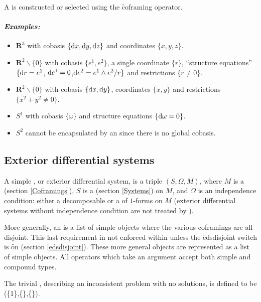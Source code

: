 A  is constructed or selected using the \f{coframing}
operator.

\paragraph{\textit{Examples:}}
\begin{itemize}
\item ${\mathbf{R}}^3$ with cobasis $\{\mathrm{d} x,\mathrm{d} y,\mathrm{d} z\}$ and coordinates $\{x,y,z\}$.
\item ${\mathbf{R}}^2\backslash\{0\}$ with cobasis $\{e^1,e^2\}$, a single
	coordinate $\{r\}$, ``structure equations'' $\{\mathrm{d} r = e^1$,
	$\mathrm{d} e^1=0$,$\mathrm{d} e^2=e^1\wedge e^2/r\}$ and restrictions $\{r\neq0\}$.
\item ${\mathbf{R}}^2\backslash\{0\}$ with cobasis $\{\mathrm{d} x,\mathrm{d} y\}$,
	coordinates $\{x,y\}$ and restrictions $\{x^2+y^2\neq0\}$.
\item $S^1$ with cobasis $\{\omega\}$ and structure equations
	$\{\mathrm{d}\omega = 0\}$.
\item $S^2$ cannot be encapsulated by an   since there
        is no global cobasis.
\end{itemize}

\subsection{Exterior differential systems}
\label{Exterior differential systems}

A simple , or exterior differential system, is a triple
$(S,\Omega,M)$, where $M$ is a  (section
\ref{Coframings}), $S$ is a  (section \ref{Systems}) on
$M$, and $\Omega$ is an independence condition: either a decomposable
 or a  of $1$-forms on $M$ (exterior
differential systems without independence condition are not treated by
).

More generally, an  is a list of simple  objects
where the various coframings are all disjoint. This last requirement in
not enforced within  unless the \f{edsdisjoint} switch is \f{on}
(section \ref{edsdisjoint}). These more general  objects are
represented as a list of simple  objects. All operators which
take an  argument accept both simple and compound types.

The trivial , describing an inconsistent problem with no
solutions, is defined to be (\{1\},\{\},\{\}).

